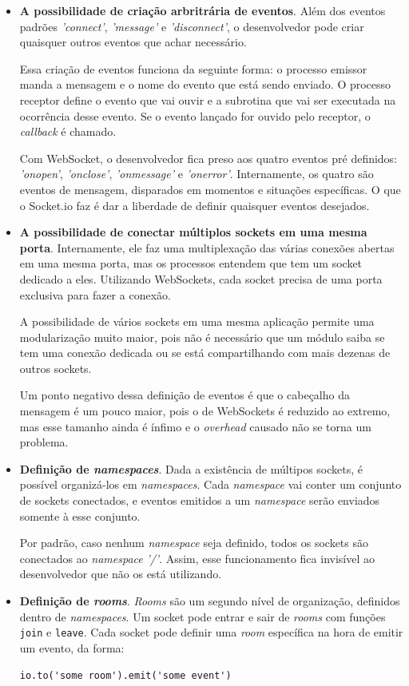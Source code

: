 \documentclass[a4paper,12pt]{article}
\newcommand{\code}[1]{\lstinline[mathescape=true, columns=fixed, basicstyle={\small\ttfamily}]{#1}}
\begin{document}
\begin{itemize}

\item \textbf{A possibilidade de criação arbritrária de eventos}. Além dos eventos padrões \emph{'connect'}, \emph{'message'} e \emph{'disconnect'}, o desenvolvedor pode criar quaisquer outros eventos que achar necessário.

Essa criação de eventos funciona da seguinte forma: o processo emissor manda a mensagem e o nome do evento que está sendo enviado. O processo receptor define o evento que vai ouvir e a subrotina que vai ser executada na ocorrência desse evento. Se o evento lançado for ouvido pelo receptor, o \emph{callback} é chamado.

Com WebSocket, o desenvolvedor fica preso aos quatro eventos pré definidos: \emph{'onopen'}, \emph{'onclose'}, \emph{'onmessage'} e \emph{'onerror'}. Internamente, os quatro são eventos de mensagem, disparados em momentos e situações específicas. O que o Socket.io faz é dar a liberdade de definir quaisquer eventos desejados.

\item \textbf{A possibilidade de conectar múltiplos sockets em uma mesma porta}. Internamente, ele faz uma multiplexação das várias conexões abertas em uma mesma porta, mas os processos entendem que tem um socket dedicado a eles. Utilizando WebSockets, cada socket precisa de uma porta exclusiva para fazer a conexão.

A possibilidade de vários sockets em uma mesma aplicação permite uma modularização muito maior, pois não é necessário que um módulo saiba se tem uma conexão dedicada ou se está compartilhando com mais dezenas de outros sockets.

Um ponto negativo dessa definição de eventos é que o cabeçalho da mensagem é um pouco maior, pois o de WebSockets é reduzido ao extremo, mas esse tamanho ainda é ínfimo e o \emph{overhead} causado não se torna um problema.

\item \textbf{Definição de \emph{namespaces}}. Dada a existência de múltipos sockets, é possível organizá-los em \emph{namespaces}. Cada \emph{namespace}
vai conter um conjunto de sockets conectados, e eventos emitidos a um \emph{namespace} serão enviados somente à esse conjunto.

Por padrão, caso nenhum \emph{namespace} seja definido, todos os sockets são conectados ao \emph{namespace} \emph{'/'}. Assim, esse funcionamento fica invisível ao desenvolvedor que não os está utilizando.

\item \textbf{Definição de \emph{rooms}}. \emph{Rooms} são um segundo nível de organização, definidos dentro de \emph{namespaces}. Um socket pode entrar e sair de \emph{rooms} com funções \code{join} e \code{leave}. Cada socket pode definir uma \emph{room} específica na hora de emitir um evento, da forma:

\code{io.to('some room').emit('some event')}

\end{itemize}
\end{document}
